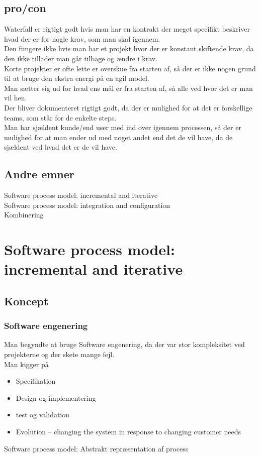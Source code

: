 \documentclass[11pt,a4paper]{article}
\begin{document}
\subsection*{pro/con}
Waterfall er rigtigt godt hvis man har en kontrakt der meget specifikt beskriver hvad der er for nogle krav, som man skal igennem.\\
Den fungere ikke hvis man har et projekt hvor der er konstant skiftende krav, da den ikke tillader man går tilbage og ændre i krav.\\
Korte projekter er ofte lette er overskue fra starten af, så der er ikke nogen grund til at bruge den ekstra energi på en agil model.\\
Man sætter sig ud for hvad ens mål er fra starten af, så alle ved hvor det er man vil hen.\\
Der bliver dokumenteret rigtigt godt, da der er mulighed for at det er forskellige teams, som står for de enkelte steps.\\
Man har sjældent kunde/end user med ind over igennem processen, så der er mulighed for at man ender ud med noget andet end det de vil have, da de sjældent ved hvad det er de vil have.
\subsection*{Andre emner}
Software process model: incremental and iterative\\
Software process model: integration and configuration\\
Kombinering
\newpage
\section{Software process model: incremental and iterative}
\subsection*{Koncept}
\subsubsection*{Software engenering}
Man begyndte at bruge Software engenering, da der var stor kompleksitet ved projekterne og der skete mange fejl.\\
Man kigger på 
\begin{itemize}
\item Specifikation
\item Design og implementering
\item test og validation
\item Evolution – changing the system in response to changing customer needs
\end{itemize}
Software process model: Abstrakt repræsentation af process
\end{document}
